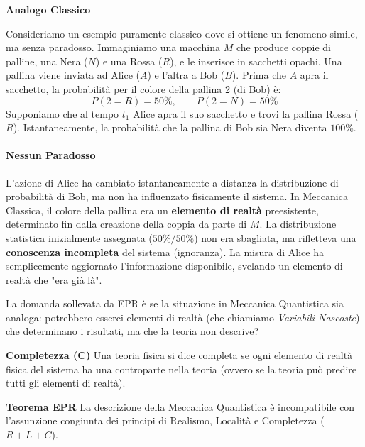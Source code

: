 \begin{example} \textbf{Analogo Classico}

Consideriamo un esempio puramente classico dove si ottiene un fenomeno simile, ma senza paradosso.
Immaginiamo una macchina \( M \) che produce coppie di palline, una Nera (\(N\)) e una Rossa (\(R\)), e le inserisce in sacchetti opachi.
Una pallina viene inviata ad Alice (\(A\)) e l'altra a Bob (\(B\)).
Prima che \(A\) apra il sacchetto, la probabilità per il colore della pallina 2 (di Bob) è:
\[
    P(2=R) = 50\%, \qquad P(2=N) = 50\%
\]
Supponiamo che al tempo \(t_1\) Alice apra il suo sacchetto e trovi la pallina Rossa (\(R\)). Istantaneamente, la probabilità che la pallina di Bob sia Nera diventa \(100\%\).

\paragraph{Nessun Paradosso}
L'azione di Alice ha cambiato istantaneamente a distanza la distribuzione di probabilità di Bob, ma non ha influenzato fisicamente il sistema.
In Meccanica Classica, il colore della pallina era un \textbf{elemento di realtà} preesistente, determinato fin dalla creazione della coppia da parte di \(M\).
La distribuzione statistica inizialmente assegnata (\(50\%/50\%\)) non era sbagliata, ma rifletteva una \textbf{conoscenza incompleta} del sistema (ignoranza).
La misura di Alice ha semplicemente aggiornato l'informazione disponibile, svelando un elemento di realtà che "era già là".
\end{example}

La domanda sollevata da EPR è se la situazione in Meccanica Quantistica sia analoga: potrebbero esserci elementi di realtà (che chiamiamo \textit{Variabili Nascoste}) che determinano i risultati, ma che la teoria non descrive?

\begin{definition}
    \textbf{Completezza (C)}
    Una teoria fisica si dice completa se ogni elemento di realtà fisica del sistema ha una controparte nella teoria (ovvero se la teoria può predire tutti gli elementi di realtà).
\end{definition}

\begin{theorem}
    \textbf{Teorema EPR}
    La descrizione della Meccanica Quantistica è incompatibile con l'assunzione congiunta dei principi di Realismo, Località e Completezza (\(R + L + C\)).
\end{theorem}

